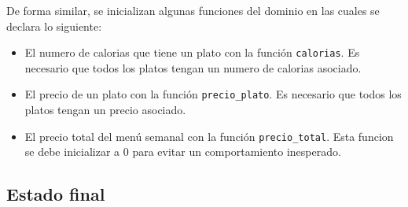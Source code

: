 De forma similar, se inicializan algunas funciones del dominio en las cuales
se declara lo siguiente:
\begin{itemize}
  \item 
    El numero de calorias que tiene un plato con la función 
    \texttt{calorias}.
    Es necesario que todos los platos tengan un numero de calorias asociado.
  \item 
    El precio de un plato con la función
    \texttt{precio\_plato}.
    Es necesario que todos los platos tengan un precio asociado.
  \item 
    El precio total del menú semanal con la función
    \texttt{precio\_total}.
    Esta funcion se debe inicializar a 0 para evitar un comportamiento 
    inesperado.
\end{itemize}

\subsection{Estado final}
